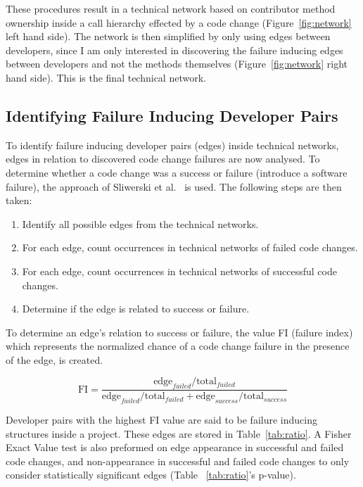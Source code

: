 \documentclass[conference]{IEEEtran}
\begin{document}
These procedures result in a technical network based on contributor method ownership 
inside a call hierarchy effected by a code change (Figure~\ref{fig:network} left hand side).
The network is then simplified by only using edges between developers, since I
am only interested in discovering the failure inducing edges between developers and not the 
methods themselves (Figure~\ref{fig:network} right hand side). This is the final technical 
network.

\subsection{Identifying Failure Inducing Developer Pairs}
To identify failure inducing developer pairs (edges) inside technical networks, 
edges in relation to discovered code change failures are now analysed. To determine whether a code change 
was a success or failure (introduce a software failure), the approach of
Sliwerski et al.~\cite{Sliwerski:2005:CIF} is used. The following steps are then taken:

\begin{enumerate}
\item Identify all possible edges from the technical networks.
\item For each edge, count occurrences in technical networks of failed code changes.
\item For each edge, count occurrences in technical networks of successful code changes.
\item Determine if the edge is related to success or failure.
\end{enumerate}

To determine an edge's relation to success or failure,  the value FI (failure
index) which represents the normalized chance of a code change failure in the presence
of the edge, is created. 

\begin{equation}
\text{FI} = \frac{ \text{edge}_{failed} / \text{total}_{failed}}{\text{edge}_{failed} / \text{total}_{failed} + \text{edge}_{success} / \text{total}_{success}}
\end{equation}

Developer pairs with the highest FI value are said to be failure inducing structures
inside a project. These edges are stored in Table~\ref{tab:ratio}. A Fisher Exact Value test 
is also preformed on edge appearance in successful and failed
code changes, and non-appearance in successful and failed code changes to only
consider statistically significant edges (Table ~\ref{tab:ratio}'s p-value). 
\end{document}
